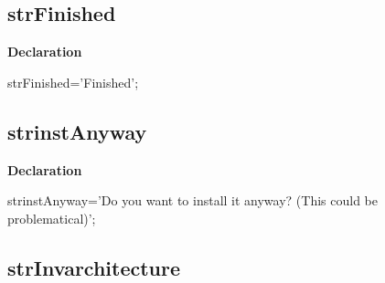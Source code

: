\documentclass{report}
\newif\ifpdf
\begin{document}
\subsection*{strFinished}
\fi
\label{trstrings-strFinished}
\begin{list}{}{
\setlength{\itemindent}{0cm}
\setlength{\listparindent}{0cm}
\setlength{\leftmargin}{\evensidemargin}
\addtolength{\leftmargin}{\tmplength}
\settowidth{\labelsep}{X}
\addtolength{\leftmargin}{\labelsep}
\setlength{\labelwidth}{\tmplength}
}
\item[\textbf{Declaration}\hfill]
\ifpdf
\begin{flushleft}
\fi
\begin{ttfamily}
strFinished='Finished';\end{ttfamily}

\ifpdf
\end{flushleft}
\fi

\end{list}
\ifpdf
\subsection*{\large{\textbf{strinstAnyway}}\normalsize\hspace{1ex}\hrulefill}
\else
\subsection*{strinstAnyway}
\fi
\label{trstrings-strinstAnyway}
\begin{list}{}{
\setlength{\itemindent}{0cm}
\setlength{\listparindent}{0cm}
\setlength{\leftmargin}{\evensidemargin}
\addtolength{\leftmargin}{\tmplength}
\settowidth{\labelsep}{X}
\addtolength{\leftmargin}{\labelsep}
\setlength{\labelwidth}{\tmplength}
}
\item[\textbf{Declaration}\hfill]
\ifpdf
\begin{flushleft}
\fi
\begin{ttfamily}
strinstAnyway='Do you want to install it anyway? (This could be problematical)';\end{ttfamily}

\ifpdf
\end{flushleft}
\fi

\end{list}
\ifpdf
\subsection*{\large{\textbf{strInvarchitecture}}\normalsize\hspace{1ex}\hrulefill}
\else
\end{document}
